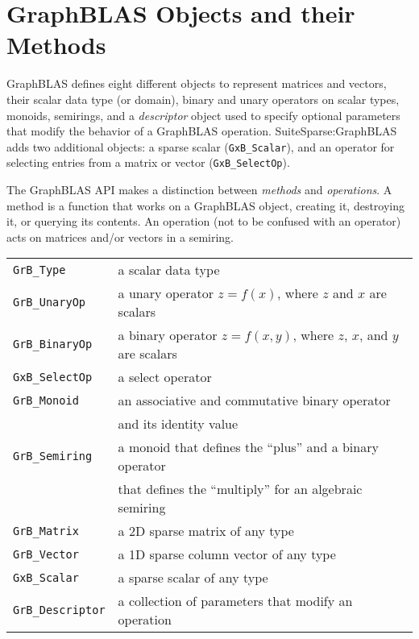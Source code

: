 \documentclass[12pt]{article}
\begin{document}
\newpage
\section{GraphBLAS Objects and their Methods} %
\label{objects}

GraphBLAS defines eight different objects to represent matrices and vectors,
their scalar data type (or domain), binary and unary operators on scalar types,
monoids, semirings, and a {\em descriptor} object used to specify optional
parameters that modify the behavior of a GraphBLAS operation.
SuiteSparse:GraphBLAS adds two additional objects: a sparse scalar
(\verb'GxB_Scalar'), and an operator for selecting entries from a matrix or
vector (\verb'GxB_SelectOp').

The GraphBLAS API makes a distinction between {\em methods} and {\em
operations}.  A method is a function that works on a GraphBLAS object, creating
it, destroying it, or querying its contents.  An operation (not to be confused
with an operator) acts on matrices and/or vectors in a semiring.

\vspace{0.1in}
\noindent
{\small
\begin{tabular}{ll}
\hline
\verb'GrB_Type'      & a scalar data type \\
\verb'GrB_UnaryOp'   & a unary operator $z=f(x)$, where $z$ and $x$ are scalars\\
\verb'GrB_BinaryOp'  & a binary operator $z=f(x,y)$, where $z$, $x$, and $y$ are scalars\\
\verb'GxB_SelectOp'  & a select operator \\
\verb'GrB_Monoid'    & an associative and commutative binary operator  \\
                     & and its identity value \\
\verb'GrB_Semiring'  & a monoid that defines the ``plus'' and a binary operator\\
                     & that defines the ``multiply'' for an algebraic semiring \\
\verb'GrB_Matrix'    & a 2D sparse matrix of any type \\
\verb'GrB_Vector'    & a 1D sparse column vector of any type \\
\verb'GxB_Scalar'    & a sparse scalar of any type \\
\verb'GrB_Descriptor'& a collection of parameters that modify an operation \\
\hline
\end{tabular}
}
\vspace{0.1in}
\end{document}
